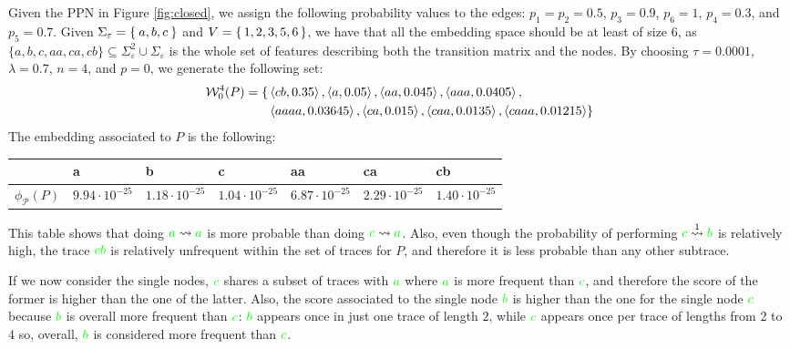 \begin{example}
Given the PPN in Figure \ref{fig:closed}, we assign the following probability values to the edges: $p_1=p_2=0.5$, $p_3=0.9$, $p_6=1$, $p_4=0.3$, and $p_5=0.7$. Given $\Sigma_\varepsilon=\Set{a,b,c}$ and $V=\set{1,2,3,5,6}$, we have that all the embedding space should be at least of size $6$, as $\{a,b,c,aa,ca,cb\}\subseteq \Sigma_\varepsilon^2\cup\Sigma_\varepsilon$ is the whole set of features describing both the transition matrix and the nodes. By choosing $\tau=0.0001$, $\lambda=0.7$, $n=4$, and $p=0$, we generate the following set:
$$\begin{aligned}
\mathcal{W}_0^4(P)=\{&\braket{cb,0.35},\braket{a,0.05},\braket{aa,0.045},\braket{aaa,0.0405},\\
&\braket{aaaa,0.03645},\braket{ca,0.015},\braket{caa,0.0135},\braket{caaa,0.01215}\}\\
\end{aligned}$$
The embedding associated to $P$ is the following:
\begin{center}
		\begin{tabular}{l|l|l|l|l|l|l|}
		\toprule
		& a    & b                                                   & c    & aa   & ca   & cb   \\
		\midrule
		$\phi_{\mathcal{P}}(P)$ & $9.94\cdot10^{-25}$ & $1.18\cdot 10^{-25}$ & $1.04\cdot10^{-25}$ & $6.87\cdot 10^{-25}$ & $2.29\cdot10^{-25}$ & $1.40\cdot10^{-25}$\\
		\bottomrule
	\end{tabular}
\end{center}
This table shows that doing ${\color{green}a}\rightsquigarrow{\color{green}a}$ is more probable than doing  ${\color{green}c}\rightsquigarrow{\color{green}a}$. Also, even though the probability of performing  ${\color{green}c}\overset{1}{\rightsquigarrow}{\color{green}b}$ is relatively high,  the trace $\color{green}cb$ is relatively unfrequent within the set of traces for $P$, and therefore it is less probable than any other subtrace. 

If we now consider the single nodes, $\color{green}c$ shares a subset of traces with $\color{green}a$ where $\color{green}a$ is more frequent than $\color{green}c$, and therefore the score of the former is higher than the one of the latter. Also, the score associated to the single node $\color{green}b$ is higher than the one for the single node $\color{green}c$ because $\color{green}b$ is overall more frequent than $\color{green}c$:  $\color{green}b$ appears once in just one trace of length $2$, while $\color{green}c$ appears once per trace of lengths from 2 to 4 so, overall, $\color{green}b$ is considered more frequent than $\color{green}c$.
\end{example}

